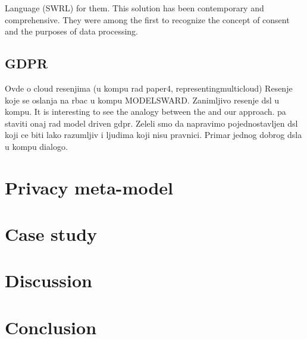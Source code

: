 \documentclass[11pt,english]{article}
\begin{document}
Language (SWRL) \cite{swrl} for them. This solution has been contemporary and comprehensive. They were among the first to recognize the concept of consent and the purposes of data processing.
\subsection{GDPR}
Ovde o cloud resenjima (u kompu rad paper4, representingmulticloud) Resenje koje se oslanja na rbac u kompu MODELSWARD. Zanimljivo resenje dsl u kompu.
It is interesting to see the analogy between the and our approach. pa staviti onaj rad model driven gdpr. Zeleli smo da napravimo pojednostavljen dsl koji ce biti lako razumljiv i ljudima koji nisu pravnici. Primar jednog dobrog dsla u kompu dialogo.
\section{Privacy meta-model}
\section{Case study}
\section{Discussion}
\section{Conclusion}
\printbibliography
\end{document}
